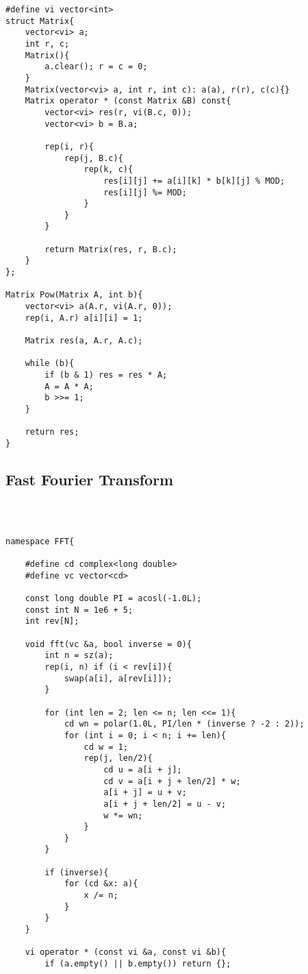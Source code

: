 \documentclass[11pt,a4paper]{article}
\begin{document}
\begin{multicols*}{2}
\begin{lstlisting}
#define vi vector<int>
struct Matrix{
	vector<vi> a;
	int r, c;
	Matrix(){
		a.clear(); r = c = 0;
	}
	Matrix(vector<vi> a, int r, int c): a(a), r(r), c(c){}
	Matrix operator * (const Matrix &B) const{
		vector<vi> res(r, vi(B.c, 0));
		vector<vi> b = B.a;
		
		rep(i, r){
			rep(j, B.c){
				rep(k, c){
					res[i][j] += a[i][k] * b[k][j] % MOD;
					res[i][j] %= MOD; 
				}
			}
		}
		
		return Matrix(res, r, B.c);
	}
};

Matrix Pow(Matrix A, int b){
	vector<vi> a(A.r, vi(A.r, 0));
	rep(i, A.r) a[i][i] = 1;
	
	Matrix res(a, A.r, A.c);
	
	while (b){
		if (b & 1) res = res * A;
		A = A * A;
		b >>= 1;
	}
	
	return res;
}
\end{lstlisting}

\subsection{Fast Fourier Transform}
\begin{lstlisting}



namespace FFT{
    
    #define cd complex<long double>
    #define vc vector<cd>

    const long double PI = acosl(-1.0L);
    const int N = 1e6 + 5;
    int rev[N];

    void fft(vc &a, bool inverse = 0){
        int n = sz(a);
        rep(i, n) if (i < rev[i]){
            swap(a[i], a[rev[i]]);
        }

        for (int len = 2; len <= n; len <<= 1){
            cd wn = polar(1.0L, PI/len * (inverse ? -2 : 2));
            for (int i = 0; i < n; i += len){
                cd w = 1;
                rep(j, len/2){
                    cd u = a[i + j];
                    cd v = a[i + j + len/2] * w;
                    a[i + j] = u + v;
                    a[i + j + len/2] = u - v;
                    w *= wn;
                }
            }
        }

        if (inverse){
            for (cd &x: a){
                x /= n;
            }
        }
    }

    vi operator * (const vi &a, const vi &b){
        if (a.empty() || b.empty()) return {};


\end{lstlisting}
\end{multicols*}
\end{document}
